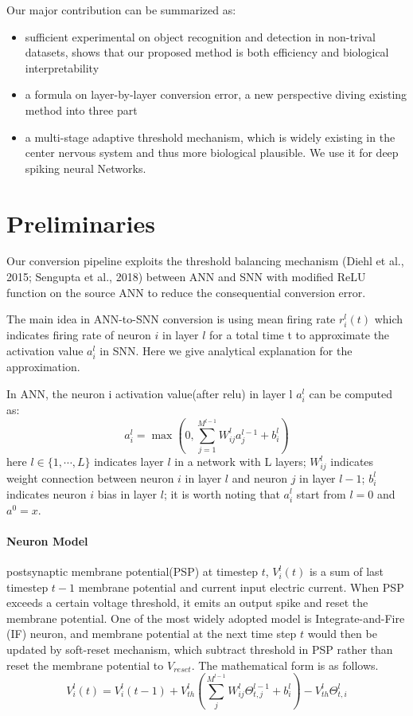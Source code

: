 \documentclass{article}
\begin{document}
Our major contribution can be summarized as:
\begin{itemize}
  \item sufficient experimental on object recognition and detection in non-trival datasets, shows that our proposed method is both efficiency and biological interpretability
  \item a formula on layer-by-layer conversion error, a new perspective diving existing method into three part 
  \item a multi-stage adaptive threshold mechanism, which is widely existing in the center nervous system and thus more biological plausible. We use it for deep spiking neural Networks.
\end{itemize}


\section{Preliminaries}
Our conversion pipeline exploits the threshold balancing mechanism (Diehl et al., 2015; Sengupta
et al., 2018) between ANN and SNN with modified ReLU function on the source ANN to reduce
the consequential conversion error. 

The main idea in ANN-to-SNN conversion is using mean firing rate $r_i^l(t)$ which indicates firing rate of neuron $i$ in layer $l$ for a total time t to approximate the activation value $a_i^l$ in SNN.
Here we give analytical explanation for the approximation.

In ANN, the neuron i activation value(after relu) in layer l $a_i^l$ can be computed as:
\begin{equation}
  a_i^l = \operatorname{max}\left(0, \sum_{j=1}^{M^{l-1}}W_{ij}^la_j^{l-1} + b_i^l\right)
\end{equation}
here $l \in \{1, \cdots ,L\}$ indicates layer $l$ in a network with L layers; $W_{ij}^l$ indicates weight connection between neuron $i$ in layer $l$ and neuron $j$ in layer $l-1$;
$b_i^l$ indicates neuron $i$ bias in layer $l$; it is worth noting that $a_i^l$ start from $l=0$ and $a^0=x$.


\paragraph{Neuron Model} postsynaptic membrane potential(PSP) at timestep $t$, $V_i^l(t)$ is a sum of last timestep $t-1$ membrane potential and current input electric current. When PSP exceeds a certain voltage threshold, it emits an output spike and reset the membrane potential.
One of the most widely adopted model is Integrate-and-Fire (IF) neuron, and membrane potential at the next time
step $t$ would then be updated by soft-reset mechanism, which subtract threshold in PSP rather than reset the membrane potential to $V_{reset}$. The mathematical form is as follows.
\begin{equation}
V_i^l(t)=V_{i}^{l}(t-1)+V_{th}^l\left(\sum_j^{M^{l-1}}W_{ij}^l\Theta_{t,j}^{l-1}+b_i^l\right)-V_{th}^l\Theta_{t,i}^{l}
\end{equation}
\end{document}
